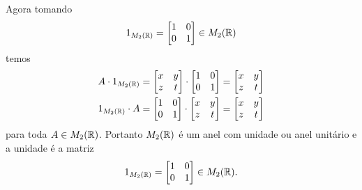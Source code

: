 \documentclass[12pt]{exam}
\begin{document}
Agora tomando
\[
    1_{M_2(\mathbb{R})} = \begin{bmatrix}
        1 & 0\\
        0 & 1
    \end{bmatrix} \in M_2(\mathbb{R})
\]
temos
\begin{align*}
    A\cdot 1_{M_2(\mathbb{R})} &= \begin{bmatrix}
        x & y\\
        z & t
    \end{bmatrix} \cdot \begin{bmatrix}
        1 & 0\\
        0 & 1
    \end{bmatrix} = \begin{bmatrix}
        x & y\\
        z & t
    \end{bmatrix}\\
    1_{M_2(\mathbb{R})}\cdot A &= \begin{bmatrix}
        1 & 0\\
        0 & 1
    \end{bmatrix}\cdot \begin{bmatrix}
        x & y\\
        z & t
    \end{bmatrix} = \begin{bmatrix}
        x & y\\
        z & t
    \end{bmatrix}
\end{align*}
para toda $A \in M_2(\mathbb{R})$. Portanto $M_2(\mathbb{R})$ \'e um anel com unidade ou anel unit\'ario e a unidade \'e a matriz
\[
    1_{M_2(\mathbb{R})} = \begin{bmatrix}
        1 & 0\\
        0 & 1
    \end{bmatrix} \in M_2(\mathbb{R}).
\]
\end{document}

